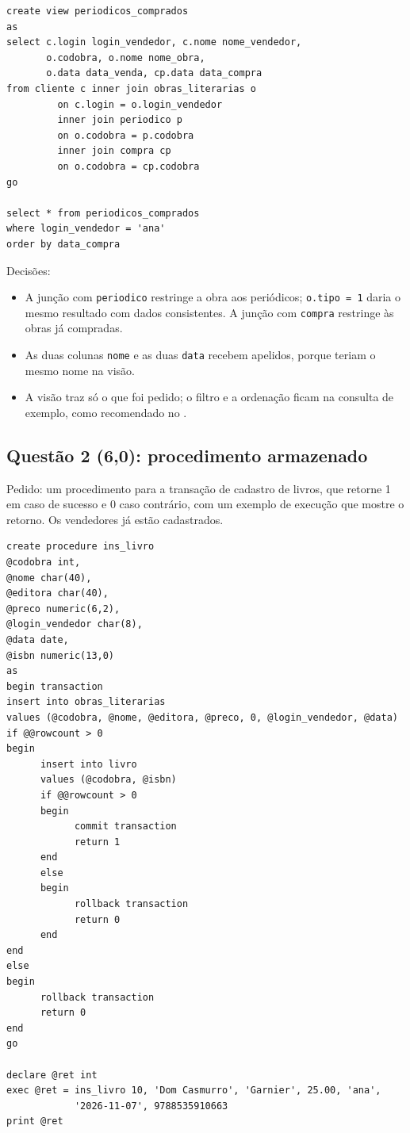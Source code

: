 \begin{lstlisting}
create view periodicos_comprados
as
select c.login login_vendedor, c.nome nome_vendedor,
       o.codobra, o.nome nome_obra,
       o.data data_venda, cp.data data_compra
from cliente c inner join obras_literarias o
         on c.login = o.login_vendedor
         inner join periodico p
         on o.codobra = p.codobra
         inner join compra cp
         on o.codobra = cp.codobra
go

select * from periodicos_comprados
where login_vendedor = 'ana'
order by data_compra
\end{lstlisting}

Decisões:

\begin{itemize}
	\item A junção com \texttt{periodico} restringe a obra aos periódicos;
	\texttt{o.tipo = 1} daria o mesmo resultado com dados consistentes. A
	junção com \texttt{compra} restringe às obras já compradas.
	\item As duas colunas \texttt{nome} e as duas \texttt{data} recebem
	apelidos, porque teriam o mesmo nome na visão.
	\item A visão traz só o que foi pedido; o filtro e a ordenação ficam na
	consulta de exemplo, como recomendado no .
\end{itemize}

\subsection{Questão 2 (6,0): procedimento armazenado}

Pedido: um procedimento para a transação de cadastro de livros, que
retorne 1 em caso de sucesso e 0 caso contrário, com um exemplo de
execução que mostre o retorno. Os vendedores já estão cadastrados.

\begin{lstlisting}
create procedure ins_livro
@codobra int,
@nome char(40),
@editora char(40),
@preco numeric(6,2),
@login_vendedor char(8),
@data date,
@isbn numeric(13,0)
as
begin transaction
insert into obras_literarias
values (@codobra, @nome, @editora, @preco, 0, @login_vendedor, @data)
if @@rowcount > 0
begin
      insert into livro
      values (@codobra, @isbn)
      if @@rowcount > 0
      begin
            commit transaction
            return 1
      end
      else
      begin
            rollback transaction
            return 0
      end
end
else
begin
      rollback transaction
      return 0
end
go

declare @ret int
exec @ret = ins_livro 10, 'Dom Casmurro', 'Garnier', 25.00, 'ana',
            '2026-11-07', 9788535910663
print @ret
\end{lstlisting}

